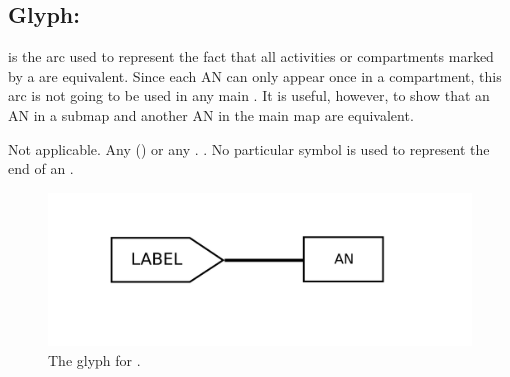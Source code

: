 
\subsection{Glyph:  }\label{sec:equivalenceArc}

 is the arc used to represent the fact that all activities or compartments
marked by a  are equivalent.  Since each AN can only appear once in a compartment, this arc is not going to be used in any main \AFm.  It is useful, however, to show that an AN in a submap and another AN in the main map are equivalent.

\begin{glyphDescription}
 \glyphSboTerm Not applicable.
 \glyphOrigin Any  () or any .
 \glyphTarget {}.
 \glyphEndPoint No particular symbol is used to represent the end of an .
 \end{glyphDescription}

\begin{figure}[H]
  \centering
  \includegraphics[scale = 0.4]{images/equivalence}
  \caption{The \AF glyph for .}
  \label{fig:equivalence}
\end{figure}
